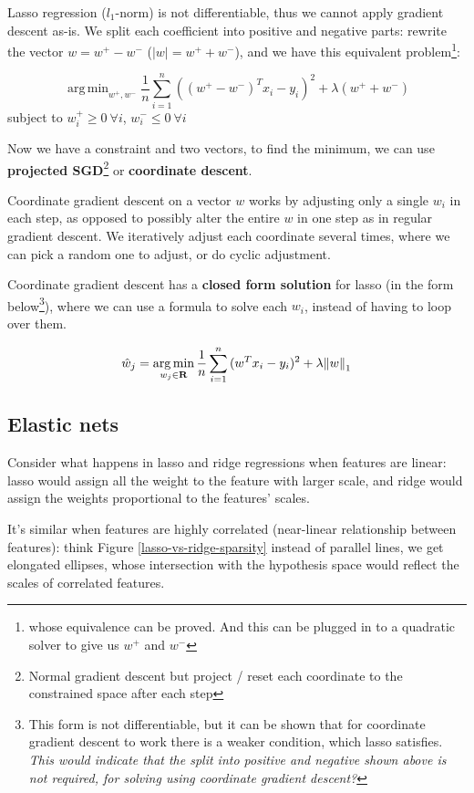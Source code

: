\documentclass{article}
\DeclareMathOperator*{\argmin}{arg\,min}
\begin{document}
Lasso regression ($\mathit{l}_1$-norm) is not differentiable, thus we cannot apply gradient descent as-is.
We split each coefficient into positive and negative parts: rewrite the vector $w = w^{+} - w^{-}$ ($|w| = w^{+} + w^{-}$), and we have this equivalent problem\footnote{whose equivalence can be proved. And this can be plugged in to a quadratic solver to give us $w^{+}$ and $w^{-}$}:

$$
\argmin_{w^{+}, w^{-}}{\frac{1}{n} \sum_{i = 1}^{n}{((w^{+} - w^{-})^{T} x_i - y_i)^2} + \lambda (w^{+} + w^{-})}
$$
subject to $w_i^{+} \geq 0 ~ \forall i$, $w_i^{-} \leq 0 ~ \forall i$

Now we have a constraint and two vectors, to find the minimum, we can use \textbf{projected SGD}\footnote{Normal gradient descent but project / reset each coordinate to the constrained space after each step} or \textbf{coordinate descent}.

Coordinate gradient descent on a vector $w$ works by adjusting only a single $w_i$ in each step, as opposed to possibly alter the entire $w$ in one step as in regular gradient descent.
We iteratively adjust each coordinate several times, where we can pick a random one to adjust, or do cyclic adjustment.

Coordinate gradient descent has a \textbf{closed form solution} for lasso (in the form below\footnote{This form is not differentiable, but it can be shown that for coordinate gradient descent to work there is a weaker condition, which lasso satisfies. \textit{This would indicate that the split into positive and negative shown above is not required, for solving using coordinate gradient descent?}}), where we can use a formula to solve each $w_i$, instead of having to loop over them.

$$
\hat{w}_j = \argmin_{w_j \in \mathbf{R}}{\frac{1}{n} \sum_{i = 1}^{n}{(w^{T} x_i - y_i)^2} + \lambda \norm{w}_1}
$$

\subsection{Elastic nets}

Consider what happens in lasso and ridge regressions when features are linear:
lasso would assign all the weight to the feature with larger scale, and ridge would assign the weights proportional to the features' scales.

It's similar when features are highly correlated (near-linear relationship between features):
think Figure \ref{lasso-vs-ridge-sparsity} instead of parallel lines, we get elongated ellipses, whose intersection with the hypothesis space would reflect the scales of correlated features.
\end{document}
